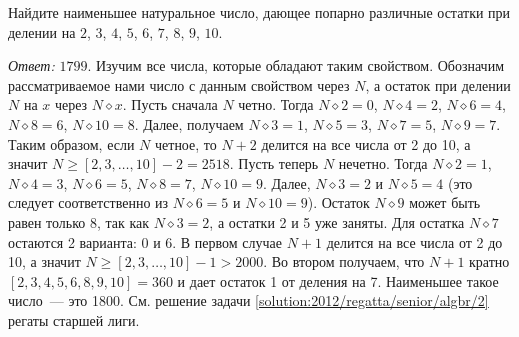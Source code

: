\problem
Найдите наименьшее натуральное число, дающее попарно различные остатки при
делении на $2$, $3$, $4$, $5$, $6$, $7$, $8$, $9$, $10$.

\solution
\label{solution:2012/pers-algbr/junior/1}%
\emph{Ответ:} $1799$.
%
\begingroup\let\div\diamond
Изучим все числа, которые обладают таким свойством.
Обозначим рассматриваемое нами число с данным свойством через $N$, а остаток
при делении $N$ на $x$ через $N \div x$.
Пусть сначала $N$ четно.
Тогда $N \div 2 = 0$, $N \div 4 = 2$, $N \div 6 = 4$, $N \div 8 = 6$,
$N \div 10 = 8$.
Далее, получаем $N \div 3 = 1$, $N \div 5 = 3$, $N \div 7 = 5$, $N \div 9 = 7$.
Таким образом, если $N$ четное, то $N + 2$ делится на все числа от 2 до 10,
а значит $N \geq [2, 3, \ldots, 10] - 2 = 2518$.
Пусть теперь $N$ нечетно.
Тогда $N \div 2 = 1$, $N \div 4 = 3$, $N \div 6 = 5$, $N \div 8 = 7$,
$N \div 10 = 9$.
Далее, $N \div 3 = 2$ и $N \div 5 = 4$
(это следует соответственно из $N \div 6 = 5$ и $N \div 10 = 9$).
Остаток $N \div 9$ может быть равен только 8, так как $N \div 3 = 2$, а остатки
2 и 5 уже заняты.
Для остатка $N \div 7$ остаются 2 варианта: 0 и 6.
В первом случае $N + 1$ делится на все числа от 2 до 10, а значит
$N \geq [2, 3, \ldots, 10] - 1 > 2000$.
Во втором получаем, что $N + 1$ кратно $[2, 3, 4, 5, 6, 8, 9, 10] = 360$ и дает
остаток 1 от деления на 7.
Наименьшее такое число~--- это 1800.
\endgroup
\else%
См. решение задачи \ref{solution:2012/regatta/senior/algbr/2} регаты старшей
лиги.
\fi

\endproblem
